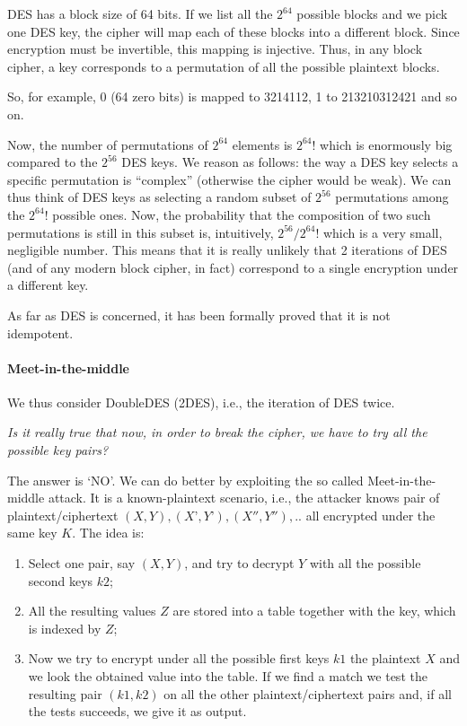 DES has a block size of 64 bits. If we list all the $2^{64}$ possible blocks and we pick one DES key, the cipher will map each of these blocks into a different block. Since encryption must be invertible, this mapping is injective. Thus, in any block cipher, a key corresponds to a permutation of all the possible plaintext blocks.


So, for example, 0 (64 zero bits) is mapped to 3214112, 1 to 213210312421 and so on. 

Now, the number of permutations of $2^{64}$ elements is $2^{64}!$ which is enormously big compared to the $2^{56}$ DES keys. We reason as follows: the way a DES key selects a specific permutation is “complex” (otherwise the cipher would be weak). We can thus think of DES keys as selecting a random subset of $2^{56}$ permutations among the $2^{64}!$ possible ones. Now, the probability that the composition of two such permutations is still in this subset is, intuitively, $2^{56} / 2^{64}!$ which is a very small, negligible number. This means that it is really unlikely that 2 iterations of DES (and of any modern block cipher, in fact) correspond to a single encryption under a different key.

As far as DES is concerned, it has been formally proved that it is not idempotent.

\paragraph{Meet-in-the-middle}
We thus consider DoubleDES (2DES), i.e., the iteration of DES twice.

\textit{Is it really true that now, in order to break the cipher, we have to try all the possible key pairs?}

The answer is ‘NO’. We can do better by exploiting the so called Meet-in-the-middle attack. It is a known-plaintext scenario, i.e., the attacker knows pair of plaintext/ciphertext $(X,Y), (X’,Y’), (X'',Y''), ..$ all encrypted under the same key $K$. The idea is:

\begin{enumerate}
    \item Select one pair, say $(X,Y)$, and try to decrypt $Y$ with all the possible second keys $k2$;
    \item All the resulting values $Z$ are stored into a table together with the key, which is indexed by $Z$;
    \item Now we try to encrypt under all the possible first keys $k1$ the plaintext $X$ and we look the obtained value into the table. If we find a match we test the resulting pair $(k1,k2)$ on all the other plaintext/ciphertext pairs and, if all the tests succeeds, we give it as output.
\end{enumerate}

